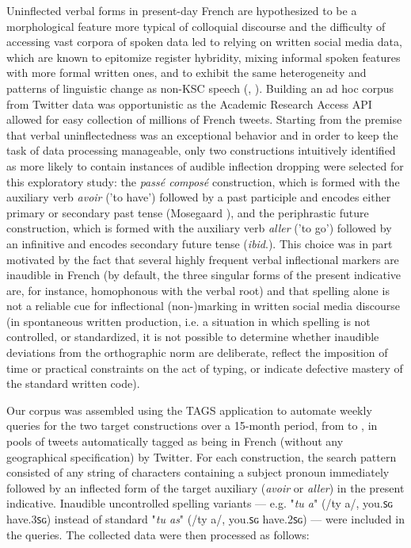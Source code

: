 \documentclass[output=paper]{langscibook}
\begin{document}
Uninflected verbal forms in present-day French are hypothesized to be a morphological feature more typical of colloquial discourse and the difficulty of accessing vast corpora of spoken data led to relying on written social media data, which are known to epitomize register hybridity, mixing informal spoken features with more formal written ones, and to exhibit the same heterogeneity and patterns of linguistic change as non-KSC speech (\citealt{TagliamonteDenis2008}, \citealt{Bohmann2020}). Building an ad hoc corpus from Twitter data was opportunistic as the Academic Research Access API allowed for easy collection of millions of French tweets. Starting from the premise that verbal uninflectedness was an exceptional behavior and in order to keep the task of data processing manageable, only two constructions intuitively identified as more likely to contain instances of audible inflection dropping were selected for this exploratory study: the \textit{passé composé} construction, which is formed with the auxiliary verb \textit{avoir} ('to have') followed by a past participle and encodes either primary or secondary past tense (Mosegaard \citealt{Hansen2016}), and the periphrastic future construction, which is formed with the auxiliary verb \textit{aller} ('to go') followed by an infinitive and encodes secondary future tense (\textit{ibid}.). This choice was in part motivated by the fact that several highly frequent verbal inflectional markers are inaudible in French (by default, the three singular forms of the present indicative are, for instance, homophonous with the verbal root) and that spelling alone is not a reliable cue for inflectional (non-)marking in written social media discourse (in spontaneous written production, i.e. a situation in which spelling is not controlled, or standardized, it is not possible to determine whether inaudible deviations from the orthographic norm are deliberate, reflect the imposition of time or practical constraints on the act of typing, or indicate defective mastery of the standard written code).

Our corpus was assembled using the TAGS application \citep{Hawksey2016} to automate weekly queries for the two target constructions over a 15-month period, from \citealt{November2020} to \citealt{February2022}, in pools of tweets automatically tagged as being in French (without any geographical specification) by Twitter. For each construction, the search pattern consisted of any string of characters containing a subject pronoun immediately followed by an inflected form of the target auxiliary (\textit{avoir} or \textit{aller}) in the present indicative. Inaudible uncontrolled spelling variants — e.g. "\textit{tu a}" (/ty a/, you.ꜱɢ have.3ꜱɢ) instead of standard "\textit{tu as}" (/ty a/, you.ꜱɢ have.2ꜱɢ) — were included in the queries. The collected data were then processed as follows:
\end{document}
